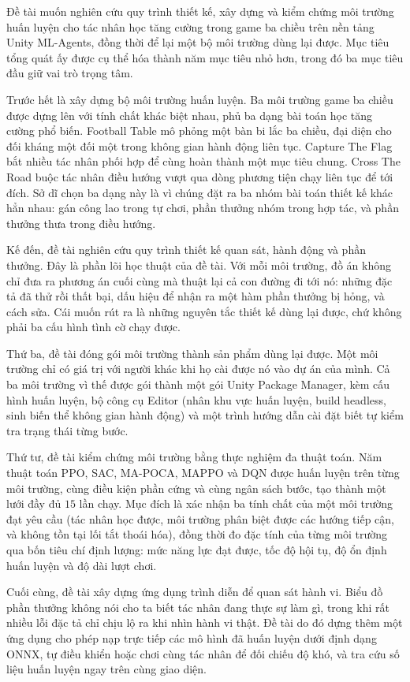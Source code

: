 Đề tài muốn nghiên cứu quy trình thiết kế, xây dựng và kiểm chứng môi trường huấn luyện cho tác nhân học tăng cường trong game ba chiều trên nền tảng Unity ML-Agents, đồng thời để lại một bộ môi trường dùng lại được. Mục tiêu tổng quát ấy được cụ thể hóa thành năm mục tiêu nhỏ hơn, trong đó ba mục tiêu đầu giữ vai trò trọng tâm.

Trước hết là xây dựng bộ môi trường huấn luyện. Ba môi trường game ba chiều được dựng lên với tính chất khác biệt nhau, phủ ba dạng bài toán học tăng cường phổ biến. Football Table mô phỏng một bàn bi lắc ba chiều, đại diện cho đối kháng một đối một trong không gian hành động liên tục. Capture The Flag bắt nhiều tác nhân phối hợp để cùng hoàn thành một mục tiêu chung. Cross The Road buộc tác nhân điều hướng vượt qua dòng phương tiện chạy liên tục để tới đích. Sở dĩ chọn ba dạng này là vì chúng đặt ra ba nhóm bài toán thiết kế khác hẳn nhau: gán công lao trong tự chơi, phần thưởng nhóm trong hợp tác, và phần thưởng thưa trong điều hướng.

Kế đến, đề tài nghiên cứu quy trình thiết kế quan sát, hành động và phần thưởng. Đây là phần lõi học thuật của đề tài. Với mỗi môi trường, đồ án không chỉ đưa ra phương án cuối cùng mà thuật lại cả con đường đi tới nó: những đặc tả đã thử rồi thất bại, dấu hiệu để nhận ra một hàm phần thưởng bị hỏng, và cách sửa. Cái muốn rút ra là những nguyên tắc thiết kế dùng lại được, chứ không phải ba cấu hình tình cờ chạy được.

Thứ ba, đề tài đóng gói môi trường thành sản phẩm dùng lại được. Một môi trường chỉ có giá trị với người khác khi họ cài được nó vào dự án của mình. Cả ba môi trường vì thế được gói thành một gói Unity Package Manager, kèm cấu hình huấn luyện, bộ công cụ Editor (nhân khu vực huấn luyện, build headless, sinh biến thể không gian hành động) và một trình hướng dẫn cài đặt biết tự kiểm tra trạng thái từng bước.

Thứ tư, đề tài kiểm chứng môi trường bằng thực nghiệm đa thuật toán. Năm thuật toán PPO, SAC,
MA-POCA, MAPPO và DQN được huấn luyện trên từng môi trường, cùng điều kiện phần cứng và cùng
ngân sách bước, tạo thành một lưới đầy đủ $15$ lần chạy. Mục đích là xác nhận ba tính chất
của một môi trường đạt yêu cầu (tác nhân học được, môi trường phân biệt được các hướng tiếp
cận, và không tồn tại lối tắt thoái hóa), đồng thời đo đặc tính của từng môi trường qua bốn
tiêu chí định lượng: mức năng lực đạt được, tốc độ hội tụ, độ ổn định huấn luyện và độ dài lượt
chơi.

Cuối cùng, đề tài xây dựng ứng dụng trình diễn để quan sát hành vi. Biểu đồ phần thưởng không nói cho ta biết tác nhân đang thực sự làm gì, trong khi rất nhiều lỗi đặc tả chỉ chịu lộ ra khi nhìn hành vi thật. Đề tài do đó dựng thêm một ứng dụng cho phép nạp trực tiếp các mô hình đã huấn luyện dưới định dạng ONNX, tự điều khiển hoặc chơi cùng tác nhân để đối chiếu độ khó, và tra cứu số liệu huấn luyện ngay trên cùng giao diện.

